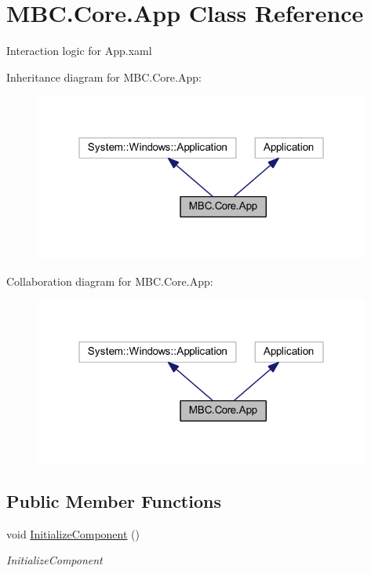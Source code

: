 \hypertarget{class_m_b_c_1_1_core_1_1_app}{\section{M\-B\-C.\-Core.\-App Class Reference}
\label{class_m_b_c_1_1_core_1_1_app}
}


Interaction logic for App.\-xaml  




Inheritance diagram for M\-B\-C.\-Core.\-App\-:\nopagebreak
\begin{figure}[H]
\begin{center}
\leavevmode
\includegraphics[width=313pt]{class_m_b_c_1_1_core_1_1_app__inherit__graph}
\end{center}
\end{figure}


Collaboration diagram for M\-B\-C.\-Core.\-App\-:\nopagebreak
\begin{figure}[H]
\begin{center}
\leavevmode
\includegraphics[width=313pt]{class_m_b_c_1_1_core_1_1_app__coll__graph}
\end{center}
\end{figure}
\subsection*{Public Member Functions}
\begin{DoxyCompactItemize}
\item 
void \hyperlink{class_m_b_c_1_1_core_1_1_app_a384006439ba20b65b5b23ba4b955aec7}{Initialize\-Component} ()
\begin{DoxyCompactList}\small\item\em Initialize\-Component \end{DoxyCompactList}\end{DoxyCompactItemize}
